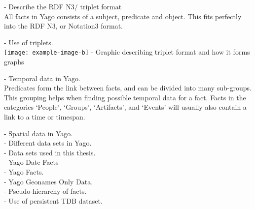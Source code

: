 - Describe the RDF N3/ triplet format\\
All facts in Yago consists of a subject, predicate and object. This fits perfectly into the RDF N3, or Notation3 format.

- Use of triplets.\\

\texttt{[image: example-image-b]}
- Graphic describing triplet format and how it forms graphs


- Temporal data in Yago.\\
Predicates form the link between facts, and can be divided into many sub-groups. This grouping helps when finding possible temporal data for a fact. Facts in the categories `People', `Groups', `Artifacts', and `Events' will usually also contain a link to a time or timespan.

- Spatial data in Yago.\\


- Different data sets in Yago.\\
- Data sets used in this thesis.\\
	- Yago Date Facts\\
	- Yago Facts.\\
	- Yago Geonames Only Data.\\
- Pseudo-hierarchy of facts.\\
- Use of persistent TDB dataset.\\

\clearpage